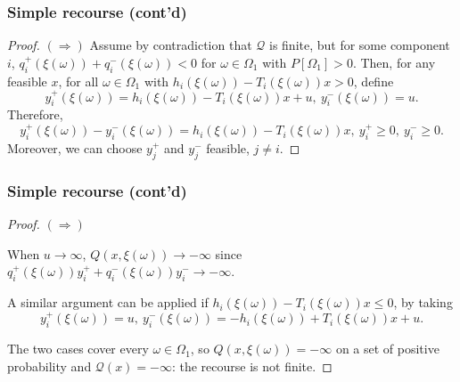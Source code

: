 \documentclass[aspectratio=169]{beamer}
\begin{document}
\begin{frame}
\frametitle{Simple recourse (cont'd)}

\begin{proof}
{\bf $(\Rightarrow)$} 
Assume by contradiction that $\mathcal{Q}$ is finite, but for some component $i$, $q_i^+(\xi(\omega)) + q_i^-(\xi(\omega)) < 0$ for $\omega \in \Omega_1$ with $P[\Omega_1] > 0$.
Then, for any feasible $x$, for all $\omega \in \Omega_1$ with $h_i(\xi(\omega))-T_i(\xi(\omega))x > 0$, define
$$
y_i^+(\xi(\omega)) = h_i(\xi(\omega)) - T_i(\xi(\omega))x + u,\  y_i^-(\xi(\omega)) = u.
$$
Therefore, 
$$
y_i^+(\xi(\omega)) - y_i^-(\xi(\omega)) = h_i(\xi(\omega)) - T_i(\xi(\omega))x,\ y_i^+ \geq 0,\ y_i^- \geq 0.
$$
Moreover, %
we can choose $y_j^+$ and $y_j^-$ feasible, $j \ne i$.

\end{proof}

\end{frame}

\begin{frame}
\frametitle{Simple recourse (cont'd)}

\begin{proof}
{\bf $(\Rightarrow)$} 

When $u \rightarrow \infty$, $Q(x, \xi(\omega)) \rightarrow -\infty$ since $q_i^+(\xi(\omega))y_i^+ + q_i^-(\xi(\omega))y_i^- \rightarrow -\infty$.

\mbox{}

A similar argument can be applied if $h_i(\xi(\omega))-T_i(\xi(\omega))x \leq 0$, by taking
$$
y_i^+(\xi(\omega)) = u,\ y_i^-(\xi(\omega)) = -h_i(\xi(\omega)) + T_i(\xi(\omega))x + u.
$$

\mbox{}

The two cases cover every $\omega \in \Omega_1$, so $Q(x,\xi(\omega)) = -\infty$ on a set of positive probability and $\mathcal{Q}(x) = -\infty$: the recourse is not finite.
\end{proof}

\end{frame}
\end{document}
